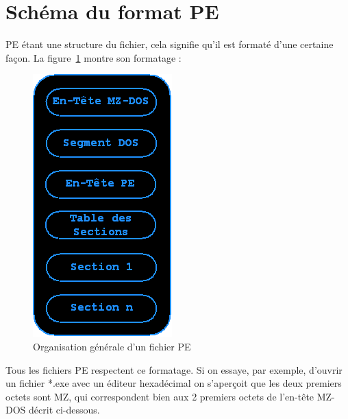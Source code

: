 \section{Schéma du format PE}
PE étant une structure du fichier, cela signifie qu'il est formaté d'une certaine façon. La figure~\ref{fig :PEX} montre son formatage :
\begin{figure}[H]
\begin{center}
\includegraphics[scale=0.6]{Figures/PE.png}
\caption{Organisation générale d'un fichier PE}
\label{fig :PEX} 
\end{center}
\end{figure}

Tous les fichiers PE respectent ce formatage. Si on essaye, par exemple, d'ouvrir un fichier *.exe avec un éditeur hexadécimal on s'aperçoit que les deux premiers octets sont MZ, qui correspondent bien aux 2 premiers octets de l'en-tête MZ-DOS décrit ci-dessous.
